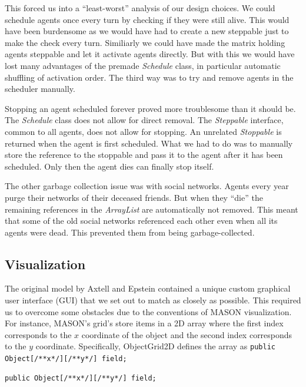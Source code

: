 \documentclass[runningheads,a4paper]{llncs}
\begin{document}
This forced us into a ``least-worst'' analysis of our design choices.
We could schedule agents once every turn by checking if they were still alive.
This would have been burdensome as we would have had to create a new steppable just to make the check every turn.
Similiarly we could have made the matrix holding agents steppable and let it activate agents directly.
But with this we would have lost many advantages of the premade \textit{Schedule} class, in particular automatic shuffling of activation order.
The third way was to try and remove agents in the scheduler manually.

Stopping an agent scheduled forever proved more troublesome than it should be.
The \textit{Schedule} class does not allow for direct removal. 
The \textit{Steppable} interface, common to all agents, does not allow for stopping.
An unrelated \textit{Stoppable} is returned when the agent is first scheduled.
What we had to do was to manually store the reference to the stoppable and pass it to the agent after it has been scheduled.
Only then the agent dies can finally stop itself.

The other garbage collection issue was with social networks.
Agents every year purge their networks of their deceased friends. 
But when they ``die'' the remaining references in the \textit{ArrayList} are automatically not removed.
This meant that some of the old social networks referenced each other even when all its agents were dead.
This prevented them from being garbage-collected.


\subsection{Visualization}

The original model by Axtell and Epstein contained a unique custom graphical user interface (GUI) that we set out to match as closely as possible. 
This required us to overcome some obstacles due to the conventions of MASON visualization. 
For instance, MASON's grid's store items in a 2D array where the first index corresponds to the $x$ coordinate of the object and the second index corresponds to the $y$ coordinate. 
Specifically, ObjectGrid2D defines the array as \lstinline!public Object[/**x*/][/**y*/] field;!

{
\linespread{1}
\begin{lstlisting}[float,caption= {The storage structure in ObjectGrid2D}, label={code:ObjectGrid2D}]
    public Object[/**x*/][/**y*/] field;
\end{lstlisting}
}
\end{document}
